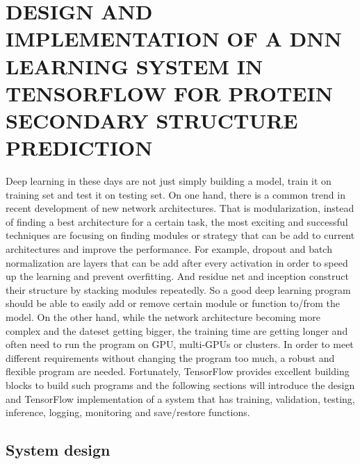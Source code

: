 \chapter{DESIGN AND IMPLEMENTATION OF A DNN LEARNING SYSTEM IN TENSORFLOW FOR PROTEIN SECONDARY STRUCTURE PREDICTION}
	\label{CH_04}
Deep learning in these days are not just simply building a model, train it on training set and test it on testing set. On one hand, there is a common trend in recent development of new network architectures. That is modularization, instead of finding a best architecture for a certain task, the most exciting and successful techniques are focusing on finding modules or strategy that can be add to current architectures and improve the performance. For example, dropout and batch normalization are layers that can be add after every activation in order to speed up the learning and prevent overfitting. And residue net and inception \cite{szegedy2015going} construct their structure by stacking modules repeatedly. So a good deep learning program should be able to easily add or remove certain module or function to/from the model. On the other hand, while the network architecture becoming more complex and the dateset getting bigger, the training time are getting longer and often need to run the program on GPU, multi-GPUs or clusters. In order to meet different requirements without changing the program too much, a robust and flexible program are needed. Fortunately, TensorFlow provides excellent building blocks to build such programs and the following sections will introduce the design and TensorFlow implementation of a system that has training, validation, testing, inference, logging, monitoring and save/restore functions.

\section{System design}
